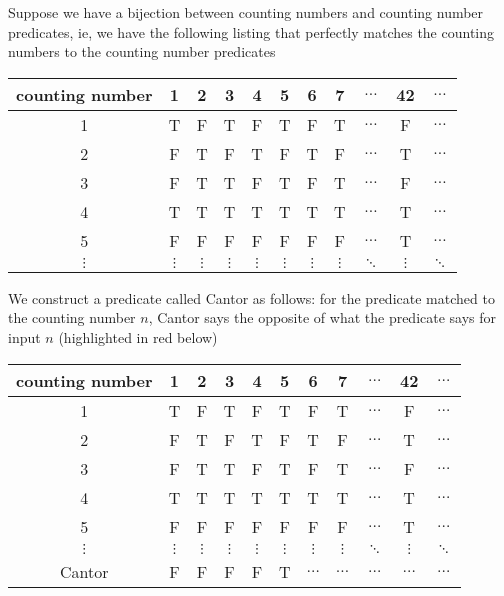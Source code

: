 \documentclass[8pt,a4paper,compress]{beamer}
\begin{document}
\begin{frame}[fragile]
\pause

Suppose we have a bijection between counting numbers and counting number predicates, ie, we have the following listing that perfectly matches the counting numbers to the counting number predicates
\begin{center}
\begin{tabular}{c|cccccccccc}
counting number & 1 & 2 & 3 & 4 & 5 & 6 & 7 & $\dots$ & 42 & $\dots$ \\ \hline
1            & T & F & T & F & T & F & T & $\dots$ & F  & $\dots$ \\ 
2            & F & T & F & T & F & T & F & $\dots$ & T  & $\dots$ \\
3            & F & T & T & F & T & F & T & $\dots$ & F  & $\dots$ \\
4            & T & T & T & T & T & T & T & $\dots$ & T  & $\dots$ \\
5            & F & F & F & F & F & F & F & $\dots$ & T  & $\dots$ \\
$\vdots$     & $\vdots$ & $\vdots$ & $\vdots$ & $\vdots$ & $\vdots$& $\vdots$ & $\vdots$ & $\ddots$ & $\vdots$ & $\ddots$
\end{tabular}
\end{center}

\pause
\bigskip

We construct a predicate called Cantor as follows: for the predicate matched to the counting number $n$, Cantor says the opposite of what the predicate says for input $n$ (highlighted in red below)
\begin{center}
\begin{tabular}{c|cccccccccc}
counting number & 1 & 2 & 3 & 4 & 5 & 6 & 7 & $\dots$ & 42 & $\dots$ \\ \hline
1            & {\color{red} T} & F & T & F & T & F & T & $\dots$ & F  & $\dots$ \\ 
2            & F & {\color{red} T} & F & T & F & T & F & $\dots$ & T  & $\dots$ \\
3            & F & T & {\color{red} T} & F & T & F & T & $\dots$ & F  & $\dots$ \\
4            & T & T & T & {\color{red} T} & T & T & T & $\dots$ & T  & $\dots$ \\
5            & F & F & F & F & {\color{red} F} & F & F & $\dots$ & T  & $\dots$ \\
$\vdots$     & $\vdots$ & $\vdots$ & $\vdots$ & $\vdots$ & $\vdots$& $\vdots$ & $\vdots$ & $\ddots$ & $\vdots$ & $\ddots$ \\ \hline
Cantor       & F & F & F & F & T & $\dots$ & $\dots$ & $\dots$ & $\dots$ & $\dots$
\end{tabular}
\end{center}
\end{frame}
\end{document}
